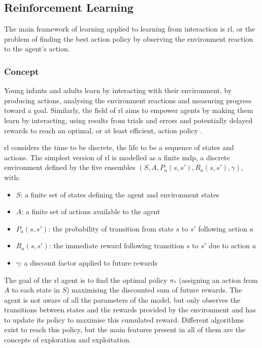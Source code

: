 \subsection{Reinforcement Learning}

The main framework of learning applied to learning from interaction is \gls{rl}, or the problem of finding the best action policy by observing the environment reaction to the agent's action.

\subsubsection{Concept} 
	Young infants and adults learn by interacting with their environment, by producing actions, analysing the environment reactions and measuring progress toward a goal. Similarly, the field of \acrfull{rl} aims to empower agents by making them learn by interacting, using results from trials and errors and potentially delayed rewards to reach an optimal, or at least efficient, action policy \citep{sutton1998reinforcement}. 

	\gls{rl} considers the time to be discrete, the life to be a sequence of states and actions. The simplest version of \gls{rl} is modelled as a finite \gls{mdp}, a discrete environment defined by the five ensembles $(S, A, P_a(s,s'), R_a(s,s'), \gamma)$, with:
	\begin{itemize}
		\item $S$: a finite set of states defining the agent and environment states
		\item $A$: a finite set of actions available to the agent
		\item $P_a(s,s')$: the probability of transition from state $s$ to $s'$ following action $a$
		\item $R_a(s,s')$: the immediate reward following transition $s$ to $s'$ due to action $a$
		\item $\gamma$: a discount factor applied to future rewards
	\end{itemize}
	
	The goal of the \gls{rl} agent is to find the optimal policy $\pi_*$ (assigning an action from $A$ to each state in $S$) maximising the discounted sum of future rewards. The agent is not aware of all the parameters of the model, but only observes the transitions between states and the rewards provided by the environment and has to update its policy to maximise this cumulated reward. Different algorithms exist to reach this policy, but the main features present in all of them are the concepts of exploration and exploitation.
	
